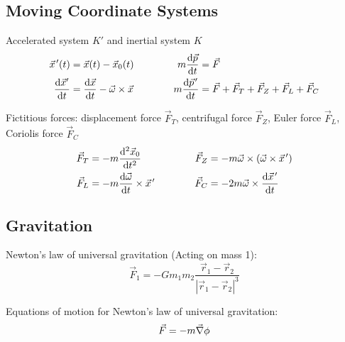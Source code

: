 	\subsection{Moving Coordinate Systems}%
		\noindent
		Accelerated system $K'$ and inertial system $K$%
		\begin{equation}
			\begin{aligned}
				\pvec{x}'(t) &= \vec{x}(t)-\vec{x}_0(t) &\hspace{30pt}
				m\tder{\vec{p}}{t} &= \vec{F} \\
				\tder{\vec{x}'}{t} &= \tder{\vec{x}}{t}-\vec{\omega}\times\vec{x} &\hspace{30pt}
				m\tder{\pvec{p}'}{t} &= \vec{F} + \vec{F}_T + \vec{F}_Z + \vec{F}_L + \vec{F}_C \\
			\end{aligned}
		\end{equation}

		\noindent
		Fictitious forces: displacement force $\vec{F}_T$, centrifugal force $\vec{F}_Z$, Euler force $\vec{F}_L$, Coriolis force $\vec{F}_C$
		\begin{equation}
			\begin{aligned}
				\vec{F}_T &= -m\frac{\diff^2 \vec{x}_0}{\diff t^2} &\hspace{30pt}
				\vec{F}_Z &= -m\vec{\omega}\times\Br{\vec{\omega}\times\pvec{x}'} \\
				\vec{F}_L &= -m\tder{\vec{\omega}}{t}\times\pvec{x}' &\hspace{30pt}
				\vec{F}_C &= -2m\vec{\omega}\times\tder{\pvec{x}'}{t} \\
			\end{aligned}
		\end{equation}


	\subsection{Gravitation}
		\noindent
		Newton's law of universal gravitation (Acting on mass 1):
		\begin{equation}
			\vec{F}_1 = - G m_1 m_2 \frac{\vec{r}_1-\vec{r}_2}{\left|\vec{r}_1-\vec{r}_2\right|^3}
		\end{equation}

		\noindent
		Equations of motion for Newton's law of universal gravitation:
		\begin{equation}
			\vec{F}=-m\vec{\nabla}\phi
		\end{equation}

